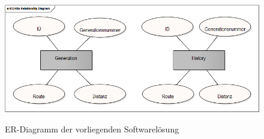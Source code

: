 \begin{appendices}
	\begin{figure}[h]
		\centering
		\caption{\acs{ER}-Diagramm der vorliegenden Softwarelösung}
		\includegraphics[width=\linewidth]{../../../01_uml/erDiagram.png}
		\label{erDiagram}
	\end{figure}


\end{appendices}
